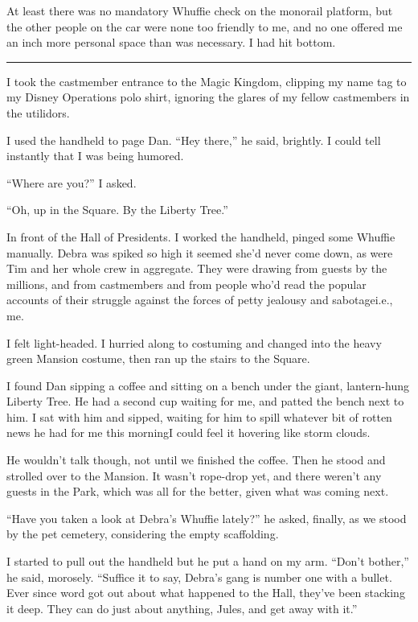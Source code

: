 At least there was no mandatory Whuffie check on the monorail
platform, but the other people on the car were none too friendly to
me, and no one offered me an inch more personal space than was
necessary. I had hit bottom.

\begin{center}\rule{3in}{0.4pt}\end{center}

I took the castmember entrance to the Magic Kingdom, clipping my
name tag to my Disney Operations polo shirt, ignoring the glares of
my fellow castmembers in the utilidors.

I used the handheld to page Dan. “Hey there,” he said, brightly. I
could tell instantly that I was being humored.

“Where are you?” I asked.

“Oh, up in the Square. By the Liberty Tree.”

In front of the Hall of Presidents. I worked the handheld, pinged
some Whuffie manually. Debra was spiked so high it seemed she'd
never come down, as were Tim and her whole crew in aggregate. They
were drawing from guests by the millions, and from castmembers and
from people who'd read the popular accounts of their struggle
against the forces of petty jealousy and sabotage{\dash}i.e., me.

I felt light-headed. I hurried along to costuming and changed into
the heavy green Mansion costume, then ran up the stairs to the
Square.

I found Dan sipping a coffee and sitting on a bench under the
giant, lantern-hung Liberty Tree. He had a second cup waiting for
me, and patted the bench next to him. I sat with him and sipped,
waiting for him to spill whatever bit of rotten news he had for me
this morning{\dash}I could feel it hovering like storm clouds.

He wouldn't talk though, not until we finished the coffee. Then he
stood and strolled over to the Mansion. It wasn't rope-drop yet,
and there weren't any guests in the Park, which was all for the
better, given what was coming next.

“Have you taken a look at Debra's Whuffie lately?” he asked,
finally, as we stood by the pet cemetery, considering the empty
scaffolding.

I started to pull out the handheld but he put a hand on my arm.
“Don't bother,” he said, morosely. “Suffice it to say, Debra's gang
is number one with a bullet. Ever since word got out about what
happened to the Hall, they've been stacking it deep. They can do
just about anything, Jules, and get away with it.”

